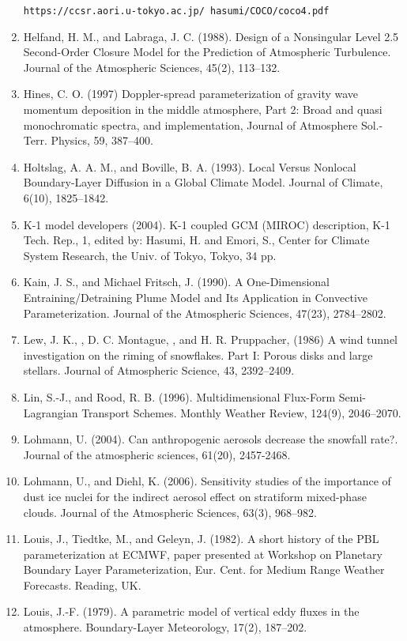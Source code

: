 \begin{enumerate}
\texttt{https://ccsr.aori.u-tokyo.ac.jp/~hasumi/COCO/coco4.pdf}
\item Helfand, H. M., and Labraga, J. C. (1988). Design of a Nonsingular Level 2.5 Second-Order Closure Model for the Prediction of Atmospheric Turbulence. Journal of the Atmospheric Sciences, 45(2), 113–132.
\item Hines, C. O. (1997) Doppler-spread parameterization of gravity wave momentum deposition in the middle atmosphere, Part 2: Broad and quasi monochromatic spectra, and implementation, Journal of Atmosphere Sol.-Terr. Physics, 59, 387–400.
\item Holtslag, A. A. M., and Boville, B. A. (1993). Local Versus Nonlocal Boundary-Layer Diffusion in a Global Climate Model. Journal of Climate, 6(10), 1825–1842.
\item K-1 model developers (2004). K-1 coupled GCM (MIROC) description, K-1 Tech. Rep., 1, edited by: Hasumi, H. and Emori, S., Center for Climate System Research, the Univ. of Tokyo, Tokyo, 34 pp.
\item Kain, J. S., and Michael Fritsch, J. (1990). A One-Dimensional Entraining/Detraining Plume Model and Its Application in Convective Parameterization. Journal of the Atmospheric Sciences, 47(23), 2784–2802.
\item Lew, J. K., , D. C. Montague, , and H. R. Pruppacher, (1986) A wind tunnel investigation on the riming of snowflakes. Part I: Porous disks and large stellars. Journal of Atmospheric Science, 43, 2392–2409.
\item Lin, S.-J., and Rood, R. B. (1996). Multidimensional Flux-Form Semi-Lagrangian Transport Schemes. Monthly Weather Review, 124(9), 2046–2070.
\item Lohmann, U. (2004). Can anthropogenic aerosols decrease the snowfall rate?. Journal of the atmospheric sciences, 61(20), 2457-2468.
\item Lohmann, U., and Diehl, K. (2006). Sensitivity studies of the importance of dust ice nuclei for the indirect aerosol effect on stratiform mixed-phase clouds. Journal of the Atmospheric Sciences, 63(3), 968–982.
\item Louis, J., Tiedtke, M., and Geleyn, J. (1982). A short history of the PBL parameterization at ECMWF, paper presented at Workshop on Planetary Boundary Layer Parameterization, Eur. Cent. for Medium Range Weather Forecasts. Reading, UK.
\item Louis, J.-F. (1979). A parametric model of vertical eddy fluxes in the atmosphere. Boundary-Layer Meteorology, 17(2), 187–202.

\end{enumerate}
